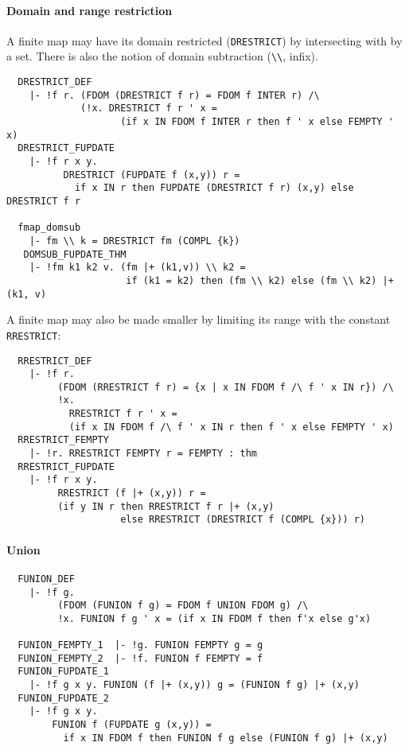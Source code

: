 \paragraph {Domain and range restriction}

A finite map may have its domain restricted ({\small\verb+DRESTRICT+})
by intersecting with by a set. There is also the notion of domain
subtraction (\verb+\\+, infix).
{\small
\begin{verbatim}
  DRESTRICT_DEF
    |- !f r. (FDOM (DRESTRICT f r) = FDOM f INTER r) /\
             (!x. DRESTRICT f r ' x =
                    (if x IN FDOM f INTER r then f ' x else FEMPTY ' x)
  DRESTRICT_FUPDATE
    |- !f r x y.
          DRESTRICT (FUPDATE f (x,y)) r =
            if x IN r then FUPDATE (DRESTRICT f r) (x,y) else DRESTRICT f r

  fmap_domsub
    |- fm \\ k = DRESTRICT fm (COMPL {k})
   DOMSUB_FUPDATE_THM
    |- !fm k1 k2 v. (fm |+ (k1,v)) \\ k2 =
                     if (k1 = k2) then (fm \\ k2) else (fm \\ k2) |+ (k1, v)
\end{verbatim}
}
\noindent A finite map may also be made smaller by limiting its range
with the constant \texttt{RRESTRICT}:
{\small
\begin{verbatim}
  RRESTRICT_DEF
    |- !f r.
         (FDOM (RRESTRICT f r) = {x | x IN FDOM f /\ f ' x IN r}) /\
         !x.
           RRESTRICT f r ' x =
           (if x IN FDOM f /\ f ' x IN r then f ' x else FEMPTY ' x)
  RRESTRICT_FEMPTY
    |- !r. RRESTRICT FEMPTY r = FEMPTY : thm
  RRESTRICT_FUPDATE
    |- !f r x y.
         RRESTRICT (f |+ (x,y)) r =
         (if y IN r then RRESTRICT f r |+ (x,y)
                    else RRESTRICT (DRESTRICT f (COMPL {x})) r)
\end{verbatim}
}

\paragraph {Union}

{\small
\begin{verbatim}
  FUNION_DEF
    |- !f g.
         (FDOM (FUNION f g) = FDOM f UNION FDOM g) /\
         !x. FUNION f g ' x = (if x IN FDOM f then f'x else g'x)

  FUNION_FEMPTY_1  |- !g. FUNION FEMPTY g = g
  FUNION_FEMPTY_2  |- !f. FUNION f FEMPTY = f
  FUNION_FUPDATE_1
    |- !f g x y. FUNION (f |+ (x,y)) g = (FUNION f g) |+ (x,y)
  FUNION_FUPDATE_2
    |- !f g x y.
        FUNION f (FUPDATE g (x,y)) =
          if x IN FDOM f then FUNION f g else (FUNION f g) |+ (x,y)
\end{verbatim}}

